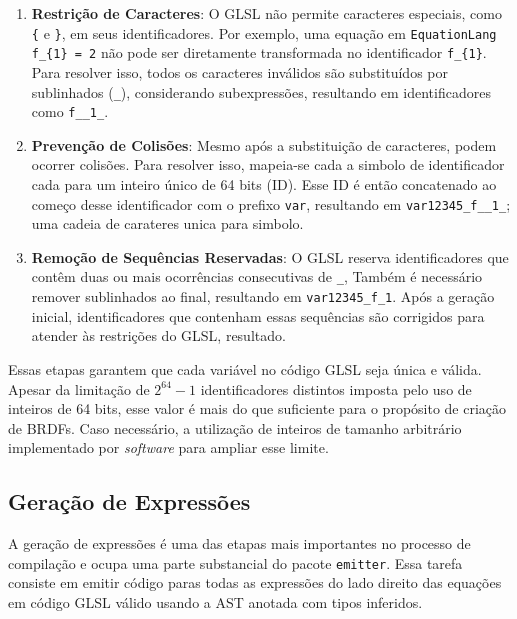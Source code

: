\begin{enumerate}
    \item \textbf{Restrição de Caracteres}: O GLSL não permite caracteres especiais, como \verb"{" e \verb"}", em seus identificadores. Por exemplo, uma equação em \texttt{EquationLang} \verb "f_{1} = 2" não pode ser diretamente transformada no identificador \verb`f_{1}`. Para resolver isso, todos os caracteres inválidos são substituídos por sublinhados (\verb`_`), considerando subexpressões, resultando em identificadores como \verb`f__1_`.

    \item \textbf{Prevenção de Colisões}: Mesmo após a substituição de caracteres, podem ocorrer colisões. Para resolver isso, mapeia-se cada a simbolo de identificador cada para um inteiro único de 64 bits (ID). Esse ID é então concatenado ao começo desse identificador com o prefixo \verb`var`, resultando em \verb`var12345_f__1_`; uma cadeia de carateres unica para simbolo.

    \item \textbf{Remoção de Sequências Reservadas}: O GLSL reserva identificadores que contêm duas ou mais ocorrências consecutivas de \verb`_`, Também é necessário remover sublinhados ao final, resultando em \verb`var12345_f_1`. Após a geração inicial, identificadores que contenham essas sequências são corrigidos para atender às restrições do GLSL, resultado.
\end{enumerate}


Essas etapas garantem que cada variável no código GLSL seja única e válida. Apesar da limitação de $2^{64} - 1$ identificadores distintos imposta pelo uso de inteiros de 64 bits, esse valor é mais do que suficiente para o propósito de criação de BRDFs. Caso necessário, a utilização de inteiros de tamanho arbitrário implementado por \textit{software} para ampliar esse limite.



\subsection{Geração de Expressões}



A geração de expressões é uma das etapas mais importantes no processo de compilação e ocupa uma parte substancial do pacote \texttt{emitter}. Essa tarefa consiste em emitir código paras todas as expressões do lado direito das equações em código GLSL válido usando a AST anotada com tipos inferidos.

